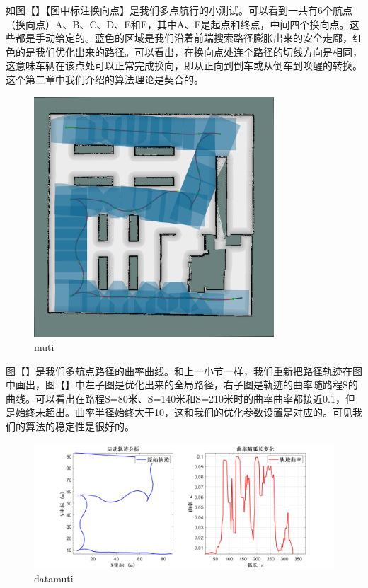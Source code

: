 \documentclass[master,academic]{ysuthesis} %
\begin{document}
		如图【】【图中标注换向点】是我们多点航行的小测试。可以看到一共有6个航点（换向点）A、B、C、D、E和F，其中A、F是起点和终点，中间四个换向点。这些都是手动给定的。蓝色的区域是我们沿着前端搜索路径膨胀出来的安全走廊，红色的是我们优化出来的路径。可以看出，在换向点处连个路径的切线方向是相同，这意味车辆在该点处可以正常完成换向，即从正向到倒车或从倒车到唤醒的转换。这个第二章中我们介绍的算法理论是契合的。
		\begin{figure}[!ht]
			\centering
			\includegraphics[width=0.8\textwidth]{muti.png}
			\caption{muti}
			\label{fig:muti}
		\end{figure}

		图【】是我们多航点路径的曲率曲线。和上一小节一样，我们重新把路径轨迹在图中画出，图【】中左子图是优化出来的全局路径，右子图是轨迹的曲率随路程S的曲线。可以看出在路程S=80米、S=140米和S=210米时的曲率曲率都接近0.1，但是始终未超出。曲率半径始终大于10，这和我们的优化参数设置是对应的。可见我们的算法的稳定性是很好的。
		\begin{figure}[!ht]
			\centering
			\includegraphics[width=1\textwidth]{datamuti.png}
			\caption{datamuti}
			\label{fig:datamuti}
		\end{figure}
\end{document}

